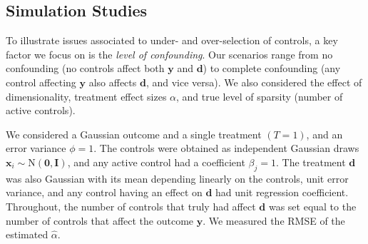 \documentclass[12pt]{article}
\newcommand{\mb}[1]{\mathbf{#1}}
\newcommand{\by}{{\mb{y}}}
\newcommand{\bd}{{\mb{d}}}
\newcommand{\bx}{{\mb{x}}}
\begin{document}
\subsection{Simulation Studies} \label{subsec:singleT}

To illustrate issues associated to under- and over-selection of controls, a key factor we focus on is the \textit{level of confounding}.
Our scenarios range from no confounding (no controls affect both $\by$ and $\bd$) to complete confounding (any control affecting $\by$ also affects $\bd$, and vice versa). We also considered the effect of dimensionality, treatment effect sizes $\alpha$, and true level of sparsity (number of active controls).

We considered a Gaussian outcome and a single treatment $(T=1)$, and an error variance $\phi = 1$. 
The controls were obtained as independent Gaussian draws $\bx_i \sim \text{N}(\mb{0}, \mb{I})$, and any active control had a coefficient $\beta_{j} = 1$.
The treatment $\bd$ was also Gaussian with its mean depending linearly on the controls, unit error variance,  and any control having an effect on $\bd$ had unit regression coefficient.
Throughout, the number of controls that truly had affect $\bd$ was set equal to the number of controls that affect the outcome $\by$.
We measured the RMSE of the estimated $\hat{\alpha}$. 
\end{document}
